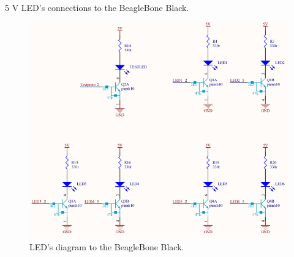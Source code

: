 5 V LED's connections to the BeagleBone Black.
\begin{figure}[H]
	\centering
	\includegraphics[scale=0.92]{figures/Led.pdf}
	\caption{LED's diagram to the BeagleBone Black.}
	\label{labLed}
\end{figure}\vspace{-5mm}


